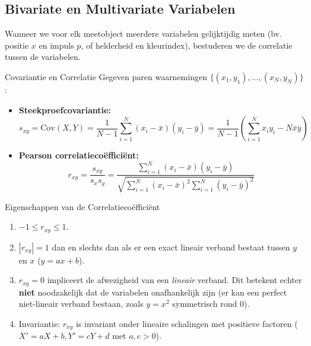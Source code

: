 \documentclass[11pt,a4paper]{article}
\newcommand{\Cov}{\text{Cov}}
\begin{document}
\subsection{Bivariate en Multivariate Variabelen}
Wanneer we voor elk meetobject meerdere variabelen gelijktijdig meten (bv. positie $x$ en impuls $p$, of helderheid en kleurindex), bestuderen we de correlatie tussen de variabelen.

\begin{defbox}{Covariantie en Correlatie}
Gegeven paren waarnemingen $\{(x_1, y_1), \ldots, (x_N, y_N)\}$:
\begin{itemize}[leftmargin=1.2em]
    \item \textbf{Steekproefcovariantie:}
    \begin{equation}
        s_{xy} = \Cov(X, Y) = \frac{1}{N-1} \sum_{i=1}^N (x_i - \bar{x})(y_i - \bar{y}) = \frac{1}{N-1} \left( \sum_{i=1}^N x_i y_i - N \bar{x}\bar{y} \right)
    \end{equation}
    \item \textbf{Pearson correlatiecoëfficiënt:}
    \begin{equation}
        r_{xy} = \frac{s_{xy}}{s_x s_y} = \frac{\sum_{i=1}^N (x_i - \bar{x})(y_i - \bar{y})}{\sqrt{\sum_{i=1}^N (x_i - \bar{x})^2 \sum_{i=1}^N (y_i - \bar{y})^2}}
    \end{equation}
\end{itemize}
\end{defbox}

\begin{theobox}{Eigenschappen van de Correlatiecoëfficiënt}
\begin{enumerate}[leftmargin=1.2em]
    \item $-1 \le r_{xy} \le 1$.
    \item $|r_{xy}| = 1$ dan en slechts dan als er een exact lineair verband bestaat tussen $y$ en $x$ ($y = ax + b$).
    \item $r_{xy} = 0$ impliceert de afwezigheid van een \emph{lineair} verband. Dit betekent echter \textbf{niet} noodzakelijk dat de variabelen onafhankelijk zijn (er kan een perfect niet-lineair verband bestaan, zoals $y = x^2$ symmetrisch rond 0).
    \item Invariantie: $r_{xy}$ is invariant onder lineaire schalingen met positieve factoren ($X' = aX + b, Y' = cY + d$ met $a, c > 0$).
\end{enumerate}
\end{theobox}
\end{document}
